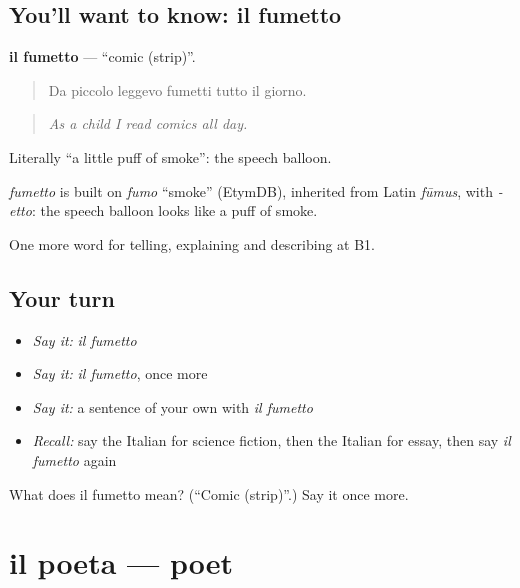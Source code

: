 \subsection*{You'll want to know: il fumetto}
\textbf{il fumetto} — \textquotedblleft{}comic (strip)\textquotedblright{}.

\begin{quote}
Da piccolo leggevo fumetti tutto il giorno.
\end{quote}

\begin{quote}
\emph{As a child I read comics all day.}
\end{quote}

Literally \textquotedblleft{}a little puff of smoke\textquotedblright{}: the speech balloon.

\begin{cousinweb}
\emph{fumetto} is built on \emph{fumo} \textquotedblleft{}smoke\textquotedblright{} (EtymDB), inherited from Latin \emph{fūmus}, with \emph{-etto}: the speech balloon looks like a puff of smoke.
\end{cousinweb}

\begin{grammarlens}[title={What you've built}]
One more word for telling, explaining and describing at B1.
\end{grammarlens}

\subsection*{Your turn}
\begin{itemize}
\raggedright
  \item \emph{Say it:} \emph{il fumetto}
  \item \emph{Say it:} \emph{il fumetto}, once more
  \item \emph{Say it:} a sentence of your own with \emph{il fumetto}
  \item \emph{Recall:} say the Italian for science fiction, then the Italian for essay, then say \emph{il fumetto} again
\end{itemize}

\begin{tcolorbox}[breakable,colback=teal!4,colframe=teal!35!black,title={Before you move on}]
What does il fumetto mean? (\textquotedblleft{}Comic (strip)\textquotedblright{}.) Say it once more.
\end{tcolorbox}
\section[il poeta]{il poeta — poet}

